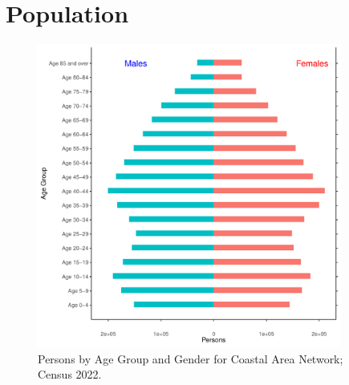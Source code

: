 \documentclass{article}
\begin{document}
\pagebreak

\section{Population} 
\label{sect:Pop}

\begin{figure}[h]
	\centering
	\includegraphics[width = 100mm]{../figures/PyramidPlot.pdf}
	\caption{Persons by Age Group and Gender for Coastal Area Network; Census 2022.}
	\label{fig:2ae19629-1a6a-13a3-e055-000000000001}
	\end{figure}
\end{document}
